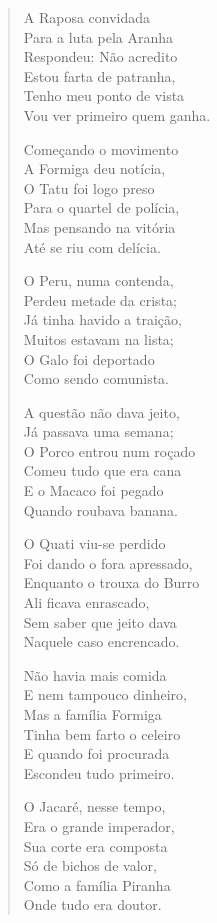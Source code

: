 \begin{verse}
A Raposa convidada\\
Para a luta pela Aranha\\
Respondeu: Não acredito\\
Estou farta de patranha,\\
Tenho meu ponto de vista\\
Vou ver primeiro quem ganha.

Começando o movimento\\
A Formiga deu notícia,\\
O Tatu foi logo preso\\
Para o quartel de polícia,\\
Mas pensando na vitória\\
Até se riu com delícia.

O Peru, numa contenda,\\
Perdeu metade da crista;\\
Já tinha havido a traição,\\
Muitos estavam na lista;\\
O Galo foi deportado\\
Como sendo comunista.
\pagebreak

A questão não dava jeito,\\
Já passava uma semana;\\
O Porco entrou num roçado\\
Comeu tudo que era cana\\
E o Macaco foi pegado\\
Quando roubava banana.

O Quati viu-se perdido\\
Foi dando o fora apressado,\\
Enquanto o trouxa do Burro\\
Ali ficava enrascado,\\
Sem saber que jeito dava\\
Naquele caso encrencado.

Não havia mais comida\\
E nem tampouco dinheiro,\\
Mas a família Formiga\\
Tinha bem farto o celeiro\\
E quando foi procurada\\
Escondeu tudo primeiro.

O Jacaré, nesse tempo,\\
Era o grande imperador,\\
Sua corte era composta\\
Só de bichos de valor,\\
Como a família Piranha\\
Onde tudo era doutor.
\pagebreak


\end{verse}
